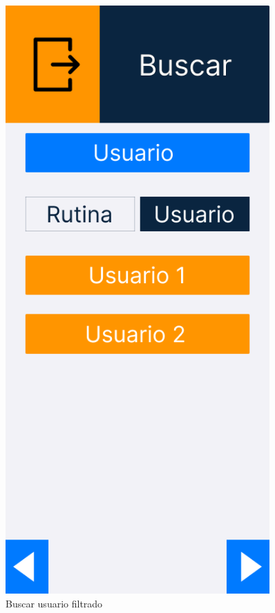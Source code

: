\begin{figure}[H]
\begin{minipage}{0.45\textwidth}
      \label{fig:Buscar usuario}
   \end{minipage}%
   \hspace{0.5cm}
   \begin{minipage}{0.45\textwidth}
      \centering
      \includegraphics[width=0.9\textwidth]{fotos/Frame 54.png}
      \caption{Buscar usuario filtrado}
      \label{fig:Buscar usuario filtrado}
   \end{minipage}
\end{figure}

